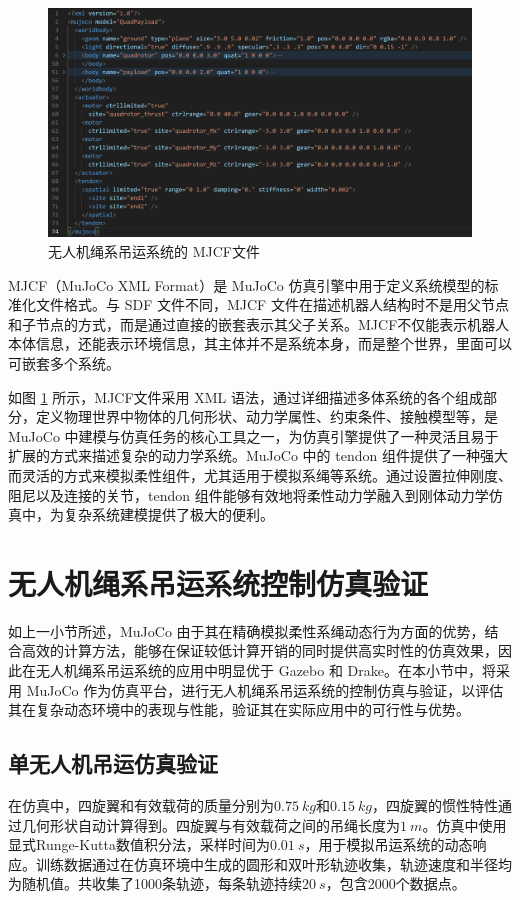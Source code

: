 \documentclass[lang=chs, degree=master, blindreview=false, winfonts=true]{yanputhesis}
\begin{document}
\begin{figure}[hbt!]
	\centering
	\includegraphics[width=36pc]{picture/MJCF.png} 
	\caption{无人机绳系吊运系统的 MJCF文件} 
	\label{MJCF}
\end{figure}
MJCF（MuJoCo XML Format）是 MuJoCo 仿真引擎中用于定义系统模型的标准化文件格式。与 SDF 文件不同，MJCF 文件在描述机器人结构时不是用父节点和子节点的方式，而是通过直接的嵌套表示其父子关系。MJCF不仅能表示机器人本体信息，还能表示环境信息，其主体并不是系统本身，而是整个世界，里面可以可嵌套多个系统。

如图 \ref{MJCF} 所示，MJCF文件采用 XML 语法，通过详细描述多体系统的各个组成部分，定义物理世界中物体的几何形状、动力学属性、约束条件、接触模型等，是 MuJoCo 中建模与仿真任务的核心工具之一，为仿真引擎提供了一种灵活且易于扩展的方式来描述复杂的动力学系统。MuJoCo 中的 tendon 组件提供了一种强大而灵活的方式来模拟柔性组件，尤其适用于模拟系绳等系统。通过设置拉伸刚度、阻尼以及连接的关节，tendon 组件能够有效地将柔性动力学融入到刚体动力学仿真中，为复杂系统建模提供了极大的便利。


\section{无人机绳系吊运系统控制仿真验证}
如上一小节所述，MuJoCo 由于其在精确模拟柔性系绳动态行为方面的优势，结合高效的计算方法，能够在保证较低计算开销的同时提供高实时性的仿真效果，因此在无人机绳系吊运系统的应用中明显优于 Gazebo 和 Drake。在本小节中，将采用 MuJoCo 作为仿真平台，进行无人机绳系吊运系统的控制仿真与验证，以评估其在复杂动态环境中的表现与性能，验证其在实际应用中的可行性与优势。

\subsection{单无人机吊运仿真验证}
在仿真中，四旋翼和有效载荷的质量分别为$0.75 \ kg$和$0.15 \ kg$，四旋翼的惯性特性通过几何形状自动计算得到。四旋翼与有效载荷之间的吊绳长度为$1 \ m$。仿真中使用显式Runge-Kutta数值积分法，采样时间为$0.01 \ s$，用于模拟吊运系统的动态响应。训练数据通过在仿真环境中生成的圆形和双叶形轨迹收集，轨迹速度和半径均为随机值。共收集了1000条轨迹，每条轨迹持续$20 \ s$，包含2000个数据点。
\end{document}
